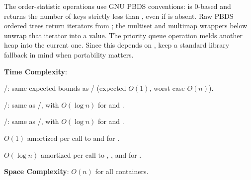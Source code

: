 The order-statistic operations use GNU PBDS conventions:  is 0-based and  returns the number of keys strictly less than , even if  is absent. Raw PBDS ordered trees return iterators from ; the multiset and multimap wrappers below unwrap that iterator into a value. The priority queue  operation melds another heap into the current one. Since this depends on , keep a standard library fallback in mind when portability matters.

\textbf{Time Complexity}:
\begin{compactitem}
  \item {}/: same expected bounds as / (expected $O(1)$, worst-case $O(n)$).
  \item {}/: same as /, with $O(\log n)$ for  and .
  \item {}/: same as /, with $O(\log n)$ for  and .
  \item $O(1)$ amortized per call to  and  for .
  \item $O(\log n)$ amortized per call to , , and  for .
\end{compactitem}

\textbf{Space Complexity}: $O(n)$ for all containers.

